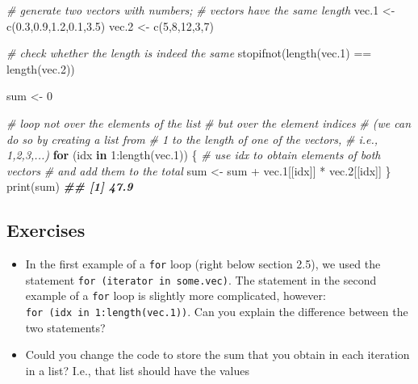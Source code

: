 \documentclass[
]{book}
\newenvironment{Shaded}{\begin{snugshade}}{\end{snugshade}}
\newcommand{\CommentTok}[1]{\textcolor[rgb]{0.56,0.35,0.01}{\textit{#1}}}
\newcommand{\ControlFlowTok}[1]{\textcolor[rgb]{0.13,0.29,0.53}{\textbf{#1}}}
\newcommand{\DecValTok}[1]{\textcolor[rgb]{0.00,0.00,0.81}{#1}}
\newcommand{\DocumentationTok}[1]{\textcolor[rgb]{0.56,0.35,0.01}{\textbf{\textit{#1}}}}
\newcommand{\FloatTok}[1]{\textcolor[rgb]{0.00,0.00,0.81}{#1}}
\newcommand{\FunctionTok}[1]{\textcolor[rgb]{0.00,0.00,0.00}{#1}}
\newcommand{\NormalTok}[1]{#1}
\newcommand{\OtherTok}[1]{\textcolor[rgb]{0.56,0.35,0.01}{#1}}
\newcommand{\SpecialCharTok}[1]{\textcolor[rgb]{0.00,0.00,0.00}{#1}}
\providecommand{\tightlist}{%
  \setlength{\itemsep}{0pt}\setlength{\parskip}{0pt}}
\begin{document}
\begin{Shaded}
\begin{Highlighting}[]
\CommentTok{\# generate two vectors with numbers; }
\CommentTok{\# vectors have the same length}
\NormalTok{vec}\FloatTok{.1} \OtherTok{\textless{}{-}} \FunctionTok{c}\NormalTok{(}\FloatTok{0.3}\NormalTok{,}\FloatTok{0.9}\NormalTok{,}\FloatTok{1.2}\NormalTok{,}\FloatTok{0.1}\NormalTok{,}\FloatTok{3.5}\NormalTok{)}
\NormalTok{vec}\FloatTok{.2} \OtherTok{\textless{}{-}} \FunctionTok{c}\NormalTok{(}\DecValTok{5}\NormalTok{,}\DecValTok{8}\NormalTok{,}\DecValTok{12}\NormalTok{,}\DecValTok{3}\NormalTok{,}\DecValTok{7}\NormalTok{)}

\CommentTok{\# check whether the length is indeed the same}
\FunctionTok{stopifnot}\NormalTok{(}\FunctionTok{length}\NormalTok{(vec}\FloatTok{.1}\NormalTok{) }\SpecialCharTok{==} \FunctionTok{length}\NormalTok{(vec}\FloatTok{.2}\NormalTok{))}

\NormalTok{sum }\OtherTok{\textless{}{-}} \DecValTok{0}

\CommentTok{\# loop not over the elements of the list}
\CommentTok{\# but over the element indices}
\CommentTok{\# (we can do so by creating a list from }
\CommentTok{\# 1 to the length of one of the vectors,}
\CommentTok{\# i.e., 1,2,3,...)}
\ControlFlowTok{for}\NormalTok{ (idx }\ControlFlowTok{in} \DecValTok{1}\SpecialCharTok{:}\FunctionTok{length}\NormalTok{(vec}\FloatTok{.1}\NormalTok{))}
\NormalTok{\{}
    \CommentTok{\# use idx to obtain elements of both vectors}
    \CommentTok{\# and add them to the total}
\NormalTok{    sum }\OtherTok{\textless{}{-}}\NormalTok{ sum }\SpecialCharTok{+} 
\NormalTok{        vec}\FloatTok{.1}\NormalTok{[[idx]] }\SpecialCharTok{*}\NormalTok{ vec}\FloatTok{.2}\NormalTok{[[idx]]}
\NormalTok{\}}
\FunctionTok{print}\NormalTok{(sum)}
\DocumentationTok{\#\# [1] 47.9}
\end{Highlighting}
\end{Shaded}

\hypertarget{exercises-1}{%
\subsection{Exercises}\label{exercises-1}}

\begin{itemize}
\tightlist
\item
  In the first example of a \texttt{for} loop (right below section 2.5), we used the statement \texttt{for\ (iterator\ in\ some.vec)}. The statement in the second example of a \texttt{for} loop is slightly more complicated, however: \texttt{for\ (idx\ in\ 1:length(vec.1))}. Can you explain the difference between the two statements?
\item
  Could you change the code to store the sum that you obtain in each iteration in a list?
  I.e., that list should have the values
\end{itemize}
\end{document}
